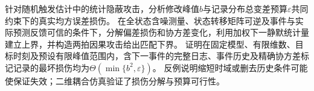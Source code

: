 针对随机触发估计中的统计隐蔽攻击，分析修改峰值$b$与记录分布总变差预算$\varepsilon$共同约束下的真实均方误差损伤。
在全状态含噪测量、状态转移矩阵可逆及事件与实际预测反馈可信的条件下，分解偏差损伤和协方差变化，利用加权下一静默统计量建立上界，并构造两拍因果攻击给出匹配下界。
证明在固定模型、有限维数、目标时刻及预设有限峰值范围内，含下一事件的完整日志、事件历史及精确协方差标记记录的最坏损伤均为$\Theta(\min\{b^2,\varepsilon\})$。
反例说明缩短时域或删去历史条件可能使保证失效；二维耦合仿真验证了损伤分解与预算可行性。
